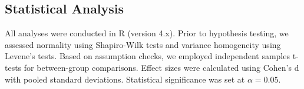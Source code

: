 \subsection{Statistical Analysis}
All analyses were conducted in R (version 4.x). Prior to hypothesis testing, we assessed normality using Shapiro-Wilk tests and variance homogeneity using Levene's tests. Based on assumption checks, we employed independent samples t-tests for between-group comparisons. Effect sizes were calculated using Cohen's d with pooled standard deviations. Statistical significance was set at $\alpha = 0.05$.

